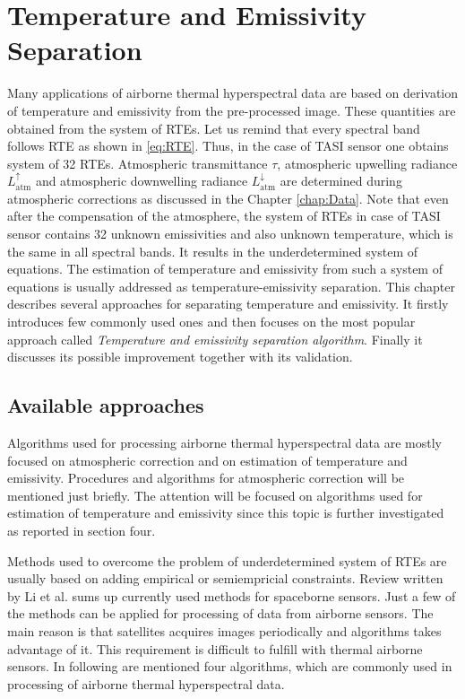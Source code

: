 \chapter{Temperature and Emissivity Separation}
\label{chap:TES}

Many applications of airborne thermal hyperspectral data are based on derivation of temperature and emissivity from the pre-processed image. These quantities are obtained from the system of RTEs. Let us remind that every spectral band follows RTE as shown in \ref{eq:RTE}. Thus, in the case of TASI sensor one obtains system of 32 RTEs. Atmospheric transmittance $\tau$, atmospheric upwelling radiance $L_\mathrm{atm}^\uparrow$ and atmospheric downwelling radiance $L_\mathrm{atm}^\downarrow$ are determined during atmospheric corrections as discussed in the Chapter \ref{chap:Data}. Note that even after the compensation of the atmosphere, the system of RTEs in case of TASI sensor contains 32 unknown emissivities and also unknown temperature, which is the same in all spectral bands. It results in the underdetermined system of equations. The estimation of temperature and emissivity from such a system of equations is usually addressed as temperature-emissivity separation. This chapter describes several approaches for separating temperature and emissivity. It firstly introduces few commonly used ones and then focuses on the most popular approach called \textit{Temperature and emissivity separation algorithm}. Finally it discusses its possible improvement together with its validation.

\section{Available approaches}

Algorithms used for processing airborne thermal hyperspectral data are mostly focused on atmospheric correction and on estimation of temperature and emissivity. Procedures and algorithms for atmospheric correction will be mentioned just briefly. The attention will be focused on algorithms used for estimation of temperature and emissivity since this topic is further investigated as reported in section four.

Methods used to overcome the problem of underdetermined system of RTEs are usually based on adding empirical or semiempricial constraints. Review written by Li et al. \cite{LZ13} sums up currently used methods for spaceborne sensors. Just a few of the methods can be applied for processing of data from airborne sensors. The main reason is that satellites acquires images periodically and algorithms takes advantage of it. This requirement is difficult to fulfill with thermal airborne sensors. In following are mentioned four algorithms, which are commonly used in processing of airborne thermal hyperspectral data.

